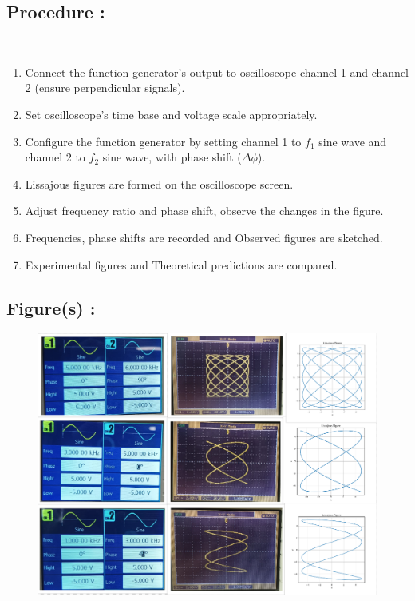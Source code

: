 \documentclass[report]{IEEEtran}
\begin{document}
\subsection{Procedure : } \\
\begin{enumerate}
    \item Connect the function generator's output to oscilloscope channel 1 and channel 2 (ensure perpendicular signals).
    \item Set oscilloscope’s time base and voltage scale appropriately.
    \item Configure the function generator by setting channel 1 to \( f_1 \) sine wave and channel 2 to \( f_2 \) sine wave, with phase shift (\( \Delta \phi \)).
    \item Lissajous figures are formed on the oscilloscope screen.
    \item Adjust frequency ratio and phase shift, observe the changes in the figure.
    \item Frequencies, phase shifts are recorded and Observed figures are sketched.
    \item Experimental figures and Theoretical predictions are compared.
\end{enumerate}

\subsection{Figure(s) : }
            \begin{figure}[h]
    \centering
    \includegraphics[width=\columnwidth]{Fig1.png}
    \label{fig:Plot1}
\end{figure}
\end{document}
